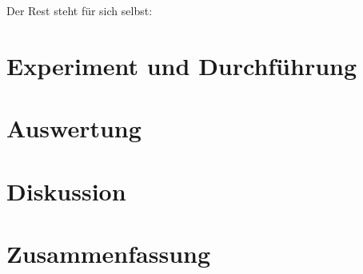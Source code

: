 Der Rest steht für sich selbst:

\section{Experiment und Durchf\"uhrung}

\section{Auswertung}

\section{Diskussion}

\section{Zusammenfassung}